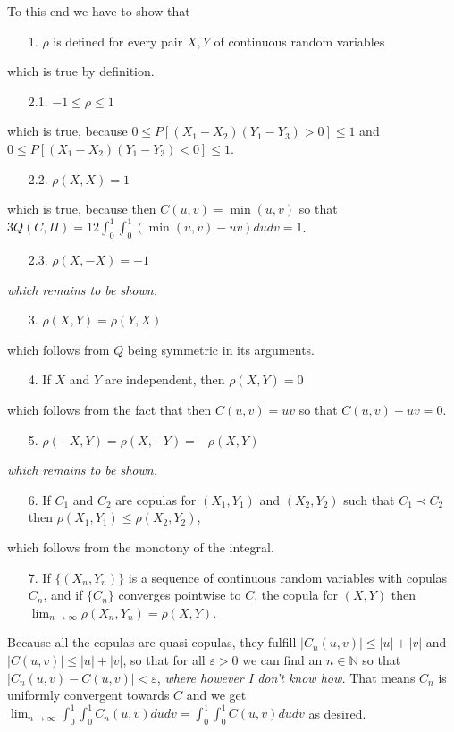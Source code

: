 \documentclass{article}
\begin{document}
To this end we have to show that
\begin{itemize}
\item [1.] $\rho$ is defined for every pair $X,Y$ of continuous random variables
\end{itemize}
which is true by definition.
\begin{itemize}
\item [2.1.] $-1\leq \rho \leq 1$ 
\end{itemize}
which is true, because $0\leq P[(X_1-X_2)(Y_1-Y_3)>0]\leq1$ and $0\leq P[(X_1-X_2)(Y_1-Y_3)<0]\leq1$.
\begin{itemize}
\item [2.2.] $\rho(X,X)=1$ 
\end{itemize}
which is true, because then $C(u,v)=\min(u,v)$ so that $3Q(C,\Pi)=12\int_0^1\int_0^1(\min(u,v)-uv)dudv=1$.
\begin{itemize}
\item [2.3.] $\rho(X,-X)=-1$
\end{itemize}
\emph{which remains to be shown.}
\begin{itemize}
\item [3.] $\rho(X,Y)=\rho(Y,X)$
\end{itemize}
which follows from $Q$ being symmetric in its arguments.
\begin{itemize}
\item [4.] If $X$ and $Y$ are independent, then $\rho(X,Y)=0$
\end{itemize}
which follows from the fact that then $C(u,v)=uv$ so that $C(u,v)-uv=0$.
\begin{itemize}
\item [5.] $\rho(-X,Y)=\rho(X,-Y)=-\rho(X,Y)$
\end{itemize}
\emph{which remains to be shown.}
\begin{itemize}
\item [6.] If $C_1$ and $C_2$ are copulas for $(X_1,Y_1)$ and $(X_2,Y_2)$ such that $C_1\prec C_2$ then $\rho(X_1,Y_1)\leq \rho(X_2,Y_2)$,
\end{itemize}
which follows from the monotony of the integral.
\begin{itemize}
\item [7.] If $\{(X_n,Y_n)\}$ is a sequence of continuous random variables with copulas $C_n$, and if $\{C_n\}$ converges pointwise to $C$, the copula for $(X,Y)$ then $\lim_{n\to\infty}\rho(X_n,Y_n)=\rho(X,Y)$.
\end{itemize}
Because all the copulas are quasi-copulas, they fulfill $|C_n(u,v)|\leq|u|+|v|$ and $|C(u,v)|\leq|u|+|v|$, so that for all $\varepsilon>0$ we can find an $n\in\mathbb{N}$ so that $|C_n(u,v)-C(u,v)|<\varepsilon$, \emph{where however I don't know how.}
That means $C_n$ is uniformly convergent towards $C$ and we get $\lim_{n\to\infty}\int_0^1\int_0^1C_n(u,v)dudv=\int_0^1\int_0^1C(u,v)dudv$ as desired.

\end{document}
